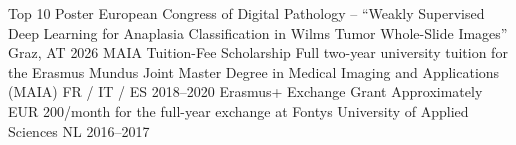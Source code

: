 
\begin{cvhonors}
  \cvhonor
    {Top 10 Poster}
    {European Congress of Digital Pathology -- ``Weakly Supervised Deep Learning for Anaplasia Classification in Wilms Tumor Whole-Slide Images''}
    {Graz, AT}
    {2026}
  \cvhonor
    {MAIA Tuition-Fee Scholarship}
    {Full two-year university tuition for the Erasmus Mundus Joint Master Degree in Medical Imaging and Applications (MAIA)}
    {FR / IT / ES}
    {2018--2020}
  \cvhonor
    {Erasmus+ Exchange Grant}
    {Approximately EUR 200/month for the full-year exchange at Fontys University of Applied Sciences}
    {NL}
    {2016--2017}
\end{cvhonors}
